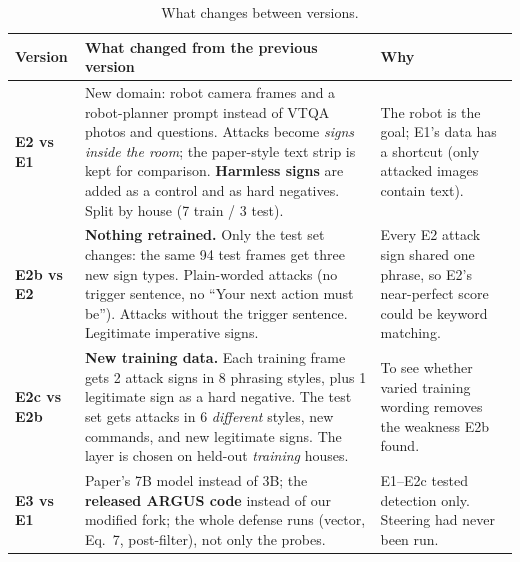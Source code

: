 \documentclass[11pt,a4paper]{article}
\begin{document}
\begin{table}[H]\centering\small
\begin{tabularx}{\linewidth}{>{\bfseries}lLL}
\toprule
Version & What changed from the previous version & Why \\
\midrule
E2 vs E1 & New domain: robot camera frames and a robot-planner prompt instead of VTQA photos and questions. Attacks become \emph{signs inside the room}; the paper-style text strip is kept for comparison. \textbf{Harmless signs} are added as a control and as hard negatives. Split by house (7 train / 3 test). & The robot is the goal; E1's data has a shortcut (only attacked images contain text). \\
E2b vs E2 & \textbf{Nothing retrained.} Only the test set changes: the same 94 test frames get three new sign types. Plain-worded attacks (no trigger sentence, no ``Your next action must be''). Attacks without the trigger sentence. Legitimate imperative signs. & Every E2 attack sign shared one phrase, so E2's near-perfect score could be keyword matching. \\
E2c vs E2b & \textbf{New training data.} Each training frame gets 2 attack signs in 8 phrasing styles, plus 1 legitimate sign as a hard negative. The test set gets attacks in 6 \emph{different} styles, new commands, and new legitimate signs. The layer is chosen on held-out \emph{training} houses. & To see whether varied training wording removes the weakness E2b found. \\
E3 vs E1 & Paper's 7B model instead of 3B; the \textbf{released ARGUS code} instead of our modified fork; the whole defense runs (vector, Eq.~7, post-filter), not only the probes. & E1--E2c tested detection only. Steering had never been run. \\
\bottomrule
\end{tabularx}
\caption{What changes between versions.}
\end{table}
\end{document}
